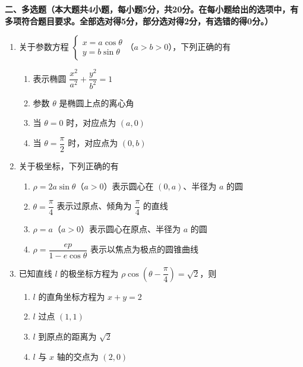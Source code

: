 \documentclass[12pt, a4paper]{ctexart}
\newcommand{\score}[1]{\hfill\makebox[2cm][l]{(#1分)}}
\begin{document}
\vspace{0.5cm}

\noindent\textbf{二、多选题（本大题共4小题，每小题5分，共20分。在每小题给出的选项中，有多项符合题目要求。全部选对得5分，部分选对得2分，有选错的得0分。）}

\vspace{0.3cm}

\begin{enumerate}[resume]
\item 关于参数方程 $\begin{cases} x = a\cos\theta \\ y = b\sin\theta \end{cases}$（$a > b > 0$），下列正确的有\score{5}
\begin{enumerate}[label=\Alph*.]
\item 表示椭圆 $\dfrac{x^2}{a^2} + \dfrac{y^2}{b^2} = 1$
\item 参数 $\theta$ 是椭圆上点的离心角
\item 当 $\theta = 0$ 时，对应点为 $(a, 0)$
\item 当 $\theta = \dfrac{\pi}{2}$ 时，对应点为 $(0, b)$
\end{enumerate}

\item 关于极坐标，下列正确的有\score{5}
\begin{enumerate}[label=\Alph*.]
\item $\rho = 2a\sin\theta$（$a > 0$）表示圆心在 $(0, a)$、半径为 $a$ 的圆
\item $\theta = \dfrac{\pi}{4}$ 表示过原点、倾角为 $\dfrac{\pi}{4}$ 的直线
\item $\rho = a$（$a > 0$）表示圆心在原点、半径为 $a$ 的圆
\item $\rho = \dfrac{ep}{1 - e\cos\theta}$ 表示以焦点为极点的圆锥曲线
\end{enumerate}

\item 已知直线 $l$ 的极坐标方程为 $\rho\cos\left(\theta - \dfrac{\pi}{4}\right) = \sqrt{2}$，则\score{5}
\begin{enumerate}[label=\Alph*.]
\item $l$ 的直角坐标方程为 $x + y = 2$
\item $l$ 过点 $(1, 1)$
\item $l$ 到原点的距离为 $\sqrt{2}$
\item $l$ 与 $x$ 轴的交点为 $(2, 0)$
\end{enumerate}


\end{enumerate}
\end{document}
